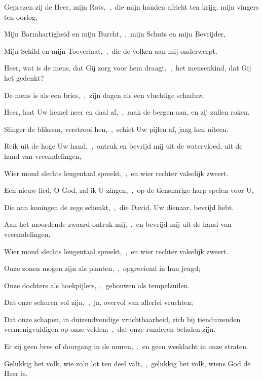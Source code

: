 \documentclass[12pt,twoside,a5paper]{article}
\begin{document}
\begin{halfparskip}
  Geprezen zij de Heer, mijn Rots,~\sep\ die mijn handen africht ten krijg, mijn vingers ten oorlog,


  Mijn Barmhartigheid en mijn Burcht,~\sep\ mijn Schuts en mijn Bevrijder,

  Mijn Schild en mijn Toeverlaat,~\sep\ die de volken aan mij onderwerpt.

  Heer, wat is de mens, dat Gij zorg voor hem draagt,~\sep\ het mensenkind, dat Gij het gedenkt?

  De mens is als een bries,~\sep\ zijn dagen als een vluchtige schaduw.

  Heer, laat Uw hemel neer en daal af,~\sep\ raak de bergen aan, en zij zullen roken.

  Slinger de bliksem, verstrooi hen,~\sep\ schiet Uw pijlen af, jaag hen uiteen.

  Reik uit de hoge Uw hand,~\sep\ ontruk en bevrijd mij uit de watervloed, uit de hand van vreemdelingen,

  Wier mond slechts leugentaal spreekt,~\sep\ en wier rechter valselijk zweert.

  Een nieuw lied, O God, zal ik U zingen,~\sep\ op de tiensnarige harp spelen voor U,

  Die aan koningen de zege schenkt,~\sep\ die David, Uw dienaar, bevrijd hebt.

  Aan het moordende zwaard ontruk mij,~\sep\ en bevrijd mij uit de hand van vreemdelingen,

  Wier mond slechts leugentaal spreekt,~\sep\ en wier rechter valselijk zweert.

  Onze zonen mogen zijn als planten,~\sep\ opgroeiend in hun jeugd;

  Onze dochters als hoekpijlers,~\sep\ gehouwen als tempelzuilen.

  Dat onze schuren vol zijn,~\sep\ ja, overvol van allerlei vruchten;

  Dat onze schapen, in duizendvoudige vruchtbaarheid, zich bij tienduizenden vermenigvuldigen op onze velden;~\sep\ dat onze runderen beladen zijn.

  Er zij geen bres of doorgang in de muren,~\sep\ en geen weeklacht in onze straten.

  Gelukkig het volk, wie zo'n lot ten deel valt,~\sep\ gelukkig het volk, wiens God de Heer is.
\end{halfparskip}
\end{document}
